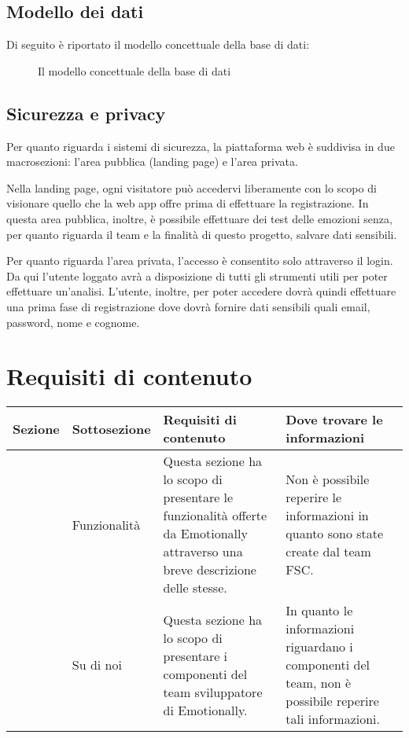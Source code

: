 \subsection{Modello dei dati}
Di seguito è riportato il modello concettuale della base di dati:

\begin{figure}[H]
	\centering
	\caption{Il modello concettuale della base di dati}
	\label{fig:er}
	
\end{figure}

\subsection{Sicurezza e privacy}
Per quanto riguarda i sistemi di sicurezza, la piattaforma web è suddivisa in 
due macrosezioni: l'area pubblica (landing page) e l'area privata.

Nella landing page, ogni visitatore può accedervi liberamente con lo scopo di 
visionare quello che la web app offre prima di effettuare la registrazione. In 
questa area pubblica, inoltre, è possibile effettuare dei test delle emozioni 
senza, per quanto riguarda il team e la finalità di questo progetto, salvare 
dati sensibili.

Per quanto riguarda l'area privata, l'accesso è consentito solo attraverso il 
login. Da qui l'utente loggato avrà a disposizione di tutti gli strumenti utili 
per poter effettuare un'analisi. L'utente, inoltre, per poter accedere dovrà 
quindi effettuare una prima fase di registrazione dove dovrà fornire dati 
sensibili quali email, password, nome e cognome.

\section{Requisiti di contenuto}\label{sec:requisiti-di-contenuto}
\begin{table}[H]
	\centering
	\caption{Contenuti di Emotionally.}
	\label{tab:bisogni-utenti}
	\begin{longtable}{@{}|>{\centering\arraybackslash}m{}|m{}|m{}|>{\centering\arraybackslash}m{}|@{}}
		\hline
		\rowcolor{emotionally-color!35}
		{\textbf{Sezione}}   & {\textbf{Sottosezione}}     & {\textbf{Requisiti di 
		contenuto}} & {\textbf{Dove trovare le informazioni}} 
		\\\hline
		\endfirsthead
		\cellcolor{white!0}  & Funzionalità & Questa sezione ha lo scopo di 
		presentare 
		le funzionalità offerte da Emotionally attraverso una breve descrizione 
		delle stesse. & Non è possibile reperire le informazioni in quanto sono 
		state create dal team FSC.\\
		\multirow{-2}{*}{Landing page} & Su di noi & Questa sezione ha lo scopo 
		di 
		presentare i componenti del team sviluppatore di Emotionally. & In 
		quanto le informazioni riguardano i componenti del team, non è 
		possibile reperire tali informazioni. \\		
		\hline
	\end{longtable}
\end{table}


